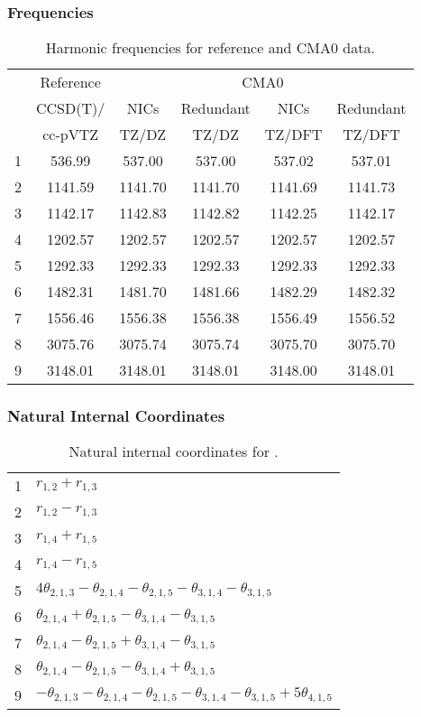 \documentclass[10pt,oneside]{article}
\begin{document}
\begin{table}[h!]
\subsubsection*{Frequencies}
\centering
\caption{Harmonic frequencies for reference and CMA0 data.}
\begin{tabular}{cccccc}
\toprule
{} & Reference & \multicolumn{4}{c}{CMA0} \\
{} &  CCSD(T)/ &    NICs &  Redundant &    NICs & Redundant \\
{} &   cc-pVTZ &   TZ/DZ &      TZ/DZ &  TZ/DFT &    TZ/DFT \\
\midrule
1 &    536.99 &  537.00 &     537.00 &  537.02 &    537.01 \\
2 &   1141.59 & 1141.70 &    1141.70 & 1141.69 &   1141.73 \\
3 &   1142.17 & 1142.83 &    1142.82 & 1142.25 &   1142.17 \\
4 &   1202.57 & 1202.57 &    1202.57 & 1202.57 &   1202.57 \\
5 &   1292.33 & 1292.33 &    1292.33 & 1292.33 &   1292.33 \\
6 &   1482.31 & 1481.70 &    1481.66 & 1482.29 &   1482.32 \\
7 &   1556.46 & 1556.38 &    1556.38 & 1556.49 &   1556.52 \\
8 &   3075.76 & 3075.74 &    3075.74 & 3075.70 &   3075.70 \\
9 &   3148.01 & 3148.01 &    3148.01 & 3148.00 &   3148.01 \\
\bottomrule
\end{tabular}
\end{table}

\begin{table}[h!]
\subsubsection*{Natural Internal Coordinates}
\centering
\caption{Natural internal coordinates for .}
\small
\begin{tabular}{ll}
\toprule
  1   & $r_{1,2} + r_{1,3}$ \\
  2   & $r_{1,2} - r_{1,3}$ \\
  3   & $r_{1,4} + r_{1,5}$ \\
  4   & $r_{1,4} - r_{1,5}$ \\
  5   & $4\theta_{2,1,3} - \theta_{2,1,4} - \theta_{2,1,5} - \theta_{3,1,4} - \theta_{3,1,5}$ \\
  6   & $\theta_{2,1,4} + \theta_{2,1,5} - \theta_{3,1,4} - \theta_{3,1,5}$ \\
  7   & $\theta_{2,1,4} - \theta_{2,1,5} + \theta_{3,1,4} - \theta_{3,1,5}$ \\
  8   & $\theta_{2,1,4} - \theta_{2,1,5} - \theta_{3,1,4} + \theta_{3,1,5}$ \\
  9   & $-\theta_{2,1,3} - \theta_{2,1,4} - \theta_{2,1,5} - \theta_{3,1,4} - \theta_{3,1,5} + 5\theta_{4,1,5}$ \\
\bottomrule
\end{tabular}
\end{table}
\end{document}

